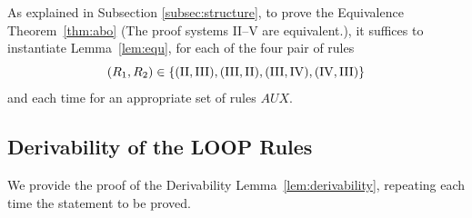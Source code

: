 \documentclass[runningheads]{llncs}       %
\newcommand{\AUX}{\mathit{AUX}}
\begin{document}
As explained in Subsection \ref{subsec:structure}, to prove the
Equivalence Theorem~\ref{thm:abo} (The proof systems II--V are equivalent.),
it suffices to instantiate Lemma~\ref{lem:equ}, 
for each of the four pair of rules
\[
  (R_1, R_2) \in \mbox{$\{{(\mathrm{II}, \mathrm{III}),
    (\mathrm{III},\mathrm{II}),
    (\mathrm{III}, \mathrm{IV}),
    (\mathrm{IV}, \mathrm{III})}\}$}
\]
and each time for an appropriate set of rules $\AUX$.


\subsection{Derivability of the LOOP Rules}
\label{subsec:proof-derivability}

We provide the proof of the Derivability Lemma~\ref{lem:derivability}, 
repeating each time the statement to be proved.




   

   

   

   
\end{document}
